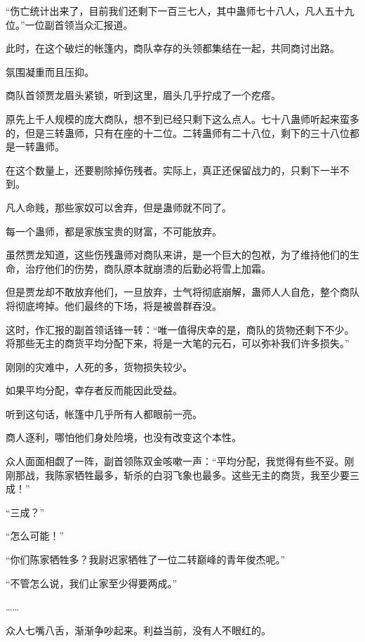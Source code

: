 
\begin{this_body}

“伤亡统计出来了，目前我们还剩下一百三七人，其中蛊师七十八人，凡人五十九位。”一位副首领当众汇报道。

此时，在这个破烂的帐篷内，商队幸存的头领都集结在一起，共同商讨出路。

氛围凝重而且压抑。

商队首领贾龙眉头紧锁，听到这里，眉头几乎拧成了一个疙瘩。

原先上千人规模的庞大商队，想不到已经只剩下这么点人。七十八蛊师听起来蛮多的，但是三转蛊师，只有在座的十二位。二转蛊师有二十八位，剩下的三十八位都是一转蛊师。

在这个数量上，还要剔除掉伤残者。实际上，真正还保留战力的，只剩下一半不到。

凡人命贱，那些家奴可以舍弃，但是蛊师就不同了。

每一个蛊师，都是家族宝贵的财富，不可能放弃。

虽然贾龙知道，这些伤残蛊师对商队来讲，是一个巨大的包袱，为了维持他们的生命，治疗他们的伤势，商队原本就崩溃的后勤必将雪上加霜。

但是贾龙却不敢放弃他们，一旦放弃，士气将彻底崩解，蛊师人人自危，整个商队将彻底垮掉。他们最终的下场，将是被兽群吞没。

这时，作汇报的副首领话锋一转：“唯一值得庆幸的是，商队的货物还剩下不少。将那些无主的商货平均分配下来，将是一大笔的元石，可以弥补我们许多损失。”

刚刚的灾难中，人死的多，货物损失较少。

如果平均分配，幸存者反而能因此受益。

听到这句话，帐篷中几乎所有人都眼前一亮。

商人逐利，哪怕他们身处险境，也没有改变这个本性。

众人面面相觑了一阵，副首领陈双金咳嗽一声：“平均分配，我觉得有些不妥。刚刚那战，我陈家牺牲最多，斩杀的白羽飞象也最多。这些无主的商货，我至少要三成！”

“三成？”

“怎么可能！”

“你们陈家牺牲多？我尉迟家牺牲了一位二转巅峰的青年俊杰呢。”

“不管怎么说，我们止家至少得要两成。”

……

众人七嘴八舌，渐渐争吵起来。利益当前，没有人不眼红的。


\end{this_body}
